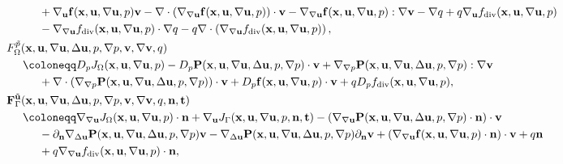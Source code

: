 \documentclass[oneside,11pt]{book}
\numberwithin{equation}{section}
\begin{document}
\begin{itemize}[leftmargin=0in]
\begin{align*}
        &\hspace{1cm}+ \nabla_{\bf u}{\bf f}({\bf x},{\bf u},\nabla{\bf u},p){\bf v} - \nabla\cdot\left(\nabla_{\nabla{\bf u}}{\bf f}({\bf x},{\bf u},\nabla{\bf u},p)\right)\cdot{\bf v} - \nabla_{\nabla{\bf u}}{\bf f}({\bf x},{\bf u},\nabla{\bf u},p):\nabla{\bf v} - \nabla q + q\nabla_{\bf u}f_{\rm div}({\bf x},{\bf u},\nabla{\bf u},p)\\
        &\hspace{1cm}- \nabla_{\nabla{\bf u}}f_{\rm div}({\bf x},{\bf u},\nabla{\bf u},p)\cdot\nabla q - q\nabla\cdot\left(\nabla_{\nabla{\bf u}}f_{\rm div}({\bf x},{\bf u},\nabla{\bf u},p)\right),\\
        &F_\Omega^{\tilde{p}}({\bf x},{\bf u},\nabla{\bf u},\Delta{\bf u},p,\nabla p,{\bf v},\nabla{\bf v},q)\\
        &\hspace{5mm}\coloneqq D_pJ_\Omega({\bf x},{\bf u},\nabla{\bf u},p) - D_p{\bf P}({\bf x},{\bf u},\nabla{\bf u},\Delta{\bf u},p,\nabla p)\cdot{\bf v} + \nabla_{\nabla p}{\bf P}({\bf x},{\bf u},\nabla{\bf u},\Delta{\bf u},p,\nabla p):\nabla{\bf v}\\
        &\hspace{1cm} + \nabla\cdot\left(\nabla_{\nabla p}{\bf P}({\bf x},{\bf u},\nabla{\bf u},\Delta{\bf u},p,\nabla p)\right)\cdot{\bf v} + D_p{\bf f}({\bf x},{\bf u},\nabla{\bf u},p)\cdot{\bf v} + qD_pf_{\rm div}({\bf x},{\bf u},\nabla{\bf u},p),\\
        &{\bf F}_\Gamma^{\tilde{\bf u}}({\bf x},{\bf u},\nabla{\bf u},\Delta{\bf u},p,\nabla p,{\bf v},\nabla{\bf v},q,{\bf n},{\bf t})\\
        &\hspace{5mm}\coloneqq\nabla_{\nabla{\bf u}}J_\Omega({\bf x},{\bf u},\nabla{\bf u},p)\cdot{\bf n} + \nabla_{\bf u}J_\Gamma({\bf x},{\bf u},\nabla{\bf u},p,{\bf n},{\bf t}) - \left(\nabla_{\nabla{\bf u}}{\bf P}({\bf x},{\bf u},\nabla{\bf u},\Delta{\bf u},p,\nabla p)\cdot{\bf n}\right)\cdot{\bf v}\\
        &\hspace{1cm} - \partial_{\bf n}\nabla_{\Delta{\bf u}}{\bf P}({\bf x},{\bf u},\nabla{\bf u},\Delta{\bf u},p,\nabla p){\bf v} - \nabla_{\Delta{\bf u}}{\bf P}({\bf x},{\bf u},\nabla{\bf u},\Delta{\bf u},p,\nabla p)\partial_{\bf n}{\bf v} + \left(\nabla_{\nabla{\bf u}}{\bf f}({\bf x},{\bf u},\nabla{\bf u},p)\cdot{\bf n}\right)\cdot{\bf v} + q{\bf n}\\
        &\hspace{1cm} + q\nabla_{\nabla{\bf u}}f_{\rm div}({\bf x},{\bf u},\nabla{\bf u},p)\cdot{\bf n},\\

\end{align*}
\end{itemize}
\end{document}
